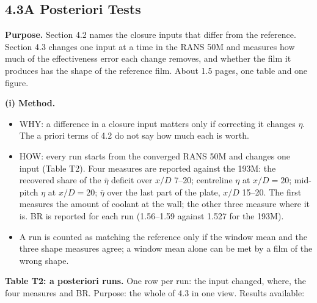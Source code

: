 \documentclass[10pt]{article}
\begin{document}
\subsection*{4.3\quad A Posteriori Tests}
\textbf{Purpose.} Section 4.2 names the closure inputs that differ from the reference. Section 4.3 changes one
input at a time in the RANS 50M and measures how much of the effectiveness error each change removes, and
whether the film it produces has the shape of the reference film. About 1.5 pages, one table and one figure.

\textbf{(i) Method.}
\begin{itemize}
\item WHY: a difference in a closure input matters only if correcting it changes $\eta$. The a priori terms of
  4.2 do not say how much each is worth.
\item HOW: every run starts from the converged RANS 50M and changes one input (Table T2). Four measures are
  reported against the 193M: the recovered share of the $\bar\eta$ deficit over $x/D$ 7--20; centreline $\eta$ at
  $x/D=20$; mid-pitch $\eta$ at $x/D=20$; $\bar\eta$ over the last part of the plate, $x/D$ 15--20. The first measures the amount
  of coolant at the wall; the other three measure where it is. BR is reported for each run (1.56--1.59 against
  1.527 for the 193M).
\item A run is counted as matching the reference only if the window mean and the three shape measures agree; a
  window mean alone can be met by a film of the wrong shape.
\end{itemize}

\textbf{Table T2: a posteriori runs.} One row per run: the input changed, where, the four measures and BR.
Purpose: the whole of 4.3 in one view. Results available:
\end{document}
